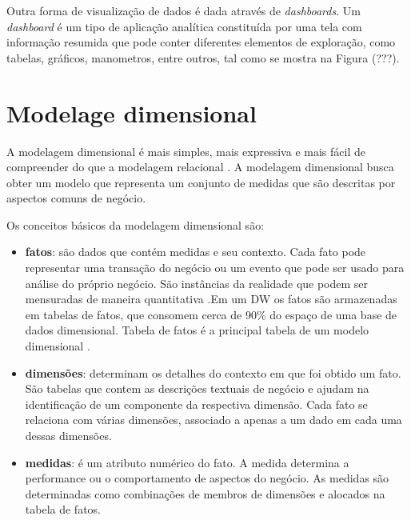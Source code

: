 %

Outra forma de visualização de dados é dada através  de \emph{dashboards}. Um \emph{dashboard} é um tipo de aplicação analítica constituída por uma tela com informação resumida que pode conter diferentes elementos de exploração, como tabelas, gráficos, manometros, entre outros, tal como se mostra na Figura (???).



%

\section{Modelage dimensional}
\label{sec-dimensional-modeling}

%

A modelagem dimensional é mais simples, mais expressiva e mais fácil de compreender do que a modelagem relacional \cite{ballard1998}. A modelagem dimensional busca obter um modelo que representa um conjunto de medidas que são descritas por aspectos comuns de negócio.

%

Os conceitos básicos da modelagem dimensional são:

\begin{itemize}
	\item \textbf{fatos}: são dados que contém medidas e seu contexto. Cada fato pode representar uma transação do negócio ou um evento que pode ser usado para análise do próprio negócio. São instâncias da realidade  que podem ser mensuradas de maneira quantitativa \cite{kimball2002}.Em um DW os fatos são armazenadas em tabelas de fatos, que consomem cerca de 90\% do espaço de uma base de dados dimensional. Tabela de fatos é a principal tabela de um modelo dimensional \cite{kimball2002} \cite{ballard1998}.
	\item \textbf{dimensões}: determinam os detalhes do contexto em que foi obtido um fato. São tabelas que contem as descrições textuais de negócio e ajudam na identificação de um componente da respectiva dimensão. Cada fato se relaciona com várias dimensões, associado a apenas a um dado em cada uma dessas dimensões.
	\item \textbf{medidas}: é um atributo numérico do fato. A medida determina a performance ou o comportamento de aspectos do negócio. As medidas são determinadas como combinações de membros de dimensões e alocados na tabela de fatos.
\end{itemize}

